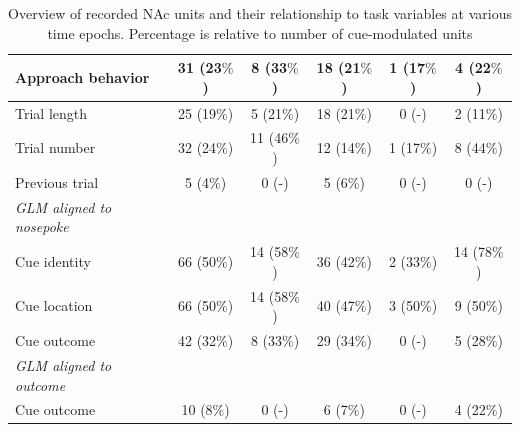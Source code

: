 \documentclass[11pt]{article}
\begin{document}
\begin{table}[p]
\begin{tabular}{l c  c c c c}
\hline
\hspace{6mm}Approach behavior      & 31 (23$\%$)         & 8 (33$\%$)          & 18 (21$\%$)          & 1 (17$\%$)          & 4 (22$\%$)\\
\hline
\hspace{6mm}Trial length       & 25 (19$\%$)        & 5 (21$\%$)          & 18 (21$\%$)         & 0 (-)         & 2 (11$\%$)\\
\hline
\hspace{6mm}Trial number       & 32 (24$\%$)         & 11 (46$\%$)          & 12 (14$\%$)         & 1 (17$\%$)          & 8 (44$\%$)\\
\hline
\hspace{6mm}Previous trial       & 5 (4$\%$)         & 0 (-)          &5 (6$\%$)          & 0 (-)          & 0 (-)\\
\hline
\hspace{3mm}\textit{GLM aligned to nosepoke}                       &         &       &          &          &\\
\hline
\hspace{6mm}Cue identity       & 66 (50$\%$)         &14 (58$\%$)          & 36 (42$\%$)          & 2 (33$\%$)          &14 (78$\%$)\\
\hline
\hspace{6mm}Cue location       & 66 (50$\%$)         &14 (58$\%$)          & 40 (47$\%$)          & 3 (50$\%$)          & 9 (50$\%$)\\
\hline
\hspace{6mm}Cue outcome       & 42 (32$\%$)        & 8 (33$\%$)          & 29 (34$\%$)        & 0 (-)          & 5 (28$\%$)\\
\hline
\hspace{3mm}\textit{GLM aligned to outcome}                       &         &       &          &          &\\
\hline
\hspace{6mm}Cue outcome       & 10 (8$\%$)        & 0 (-)          & 6 (7$\%$)       & 0 (-)          &4 (22$\%$)\\
\hline

\end{tabular}
\caption {Overview of recorded NAc units and their relationship to task variables at various time epochs. Percentage is relative to number of cue-modulated units} \label{tbl1} 
\end{table}
\end{document}
